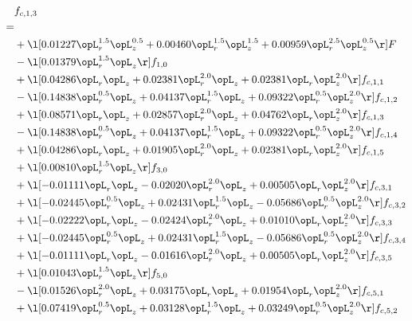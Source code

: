 \begin{alignat}{2} 
\label{eq:f_13_1} 
& f_{c,1,3} \nonumber \\ 
 = \\ 
& + \l[  0.01227 \opL_r^{1.5} \opL_z^{0.5} +  0.00460 \opL_r^{1.5} \opL_z^{1.5} +  0.00959 \opL_r^{2.5} \opL_z^{0.5}  \r] F \nonumber \\ 
& - \l[  0.01379 \opL_r^{1.5} \opL_z  \r] f_{1,0} \nonumber \\ 
& + \l[  0.04286 \opL_r \opL_z +  0.02381 \opL_r^{2.0} \opL_z +  0.02381 \opL_r \opL_z^{2.0}  \r] f_{c,1,1} \nonumber \\ 
& - \l[  0.14838 \opL_r^{0.5} \opL_z +  0.04137 \opL_r^{1.5} \opL_z +  0.09322 \opL_r^{0.5} \opL_z^{2.0}  \r] f_{c,1,2} \nonumber \\ 
& + \l[  0.08571 \opL_r \opL_z +  0.02857 \opL_r^{2.0} \opL_z +  0.04762 \opL_r \opL_z^{2.0}  \r] f_{c,1,3} \nonumber \\ 
& - \l[  0.14838 \opL_r^{0.5} \opL_z +  0.04137 \opL_r^{1.5} \opL_z +  0.09322 \opL_r^{0.5} \opL_z^{2.0}  \r] f_{c,1,4} \nonumber \\ 
& + \l[  0.04286 \opL_r \opL_z +  0.01905 \opL_r^{2.0} \opL_z +  0.02381 \opL_r \opL_z^{2.0}  \r] f_{c,1,5} \nonumber \\ 
& + \l[  0.00810 \opL_r^{1.5} \opL_z  \r] f_{3,0} \nonumber \\ 
& + \l[  -0.01111 \opL_r \opL_z   -0.02020 \opL_r^{2.0} \opL_z +  0.00505 \opL_r \opL_z^{2.0}  \r] f_{c,3,1} \nonumber \\ 
& + \l[  -0.02445 \opL_r^{0.5} \opL_z +  0.02431 \opL_r^{1.5} \opL_z   -0.05686 \opL_r^{0.5} \opL_z^{2.0}  \r] f_{c,3,2} \nonumber \\ 
& + \l[  -0.02222 \opL_r \opL_z   -0.02424 \opL_r^{2.0} \opL_z +  0.01010 \opL_r \opL_z^{2.0}  \r] f_{c,3,3} \nonumber \\ 
& + \l[  -0.02445 \opL_r^{0.5} \opL_z +  0.02431 \opL_r^{1.5} \opL_z   -0.05686 \opL_r^{0.5} \opL_z^{2.0}  \r] f_{c,3,4} \nonumber \\ 
& + \l[  -0.01111 \opL_r \opL_z   -0.01616 \opL_r^{2.0} \opL_z +  0.00505 \opL_r \opL_z^{2.0}  \r] f_{c,3,5} \nonumber \\ 
& + \l[  0.01043 \opL_r^{1.5} \opL_z  \r] f_{5,0} \nonumber \\ 
& - \l[  0.01526 \opL_r^{2.0} \opL_z +  0.03175 \opL_r \opL_z +  0.01954 \opL_r \opL_z^{2.0}  \r] f_{c,5,1} \nonumber \\ 
& + \l[  0.07419 \opL_r^{0.5} \opL_z +  0.03128 \opL_r^{1.5} \opL_z +  0.03249 \opL_r^{0.5} \opL_z^{2.0}  \r] f_{c,5,2} \nonumber \\ 

\end{alignat}
